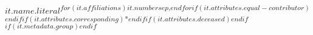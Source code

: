 $it.name.literal$\textsuperscript{$for(it.affiliations)$$it.number$$sep$,$endfor$$if(it.attributes.equal-contributor)$\Yinyang$endif$$if(it.attributes.corresponding)$*$endif$$if(it.attributes.deceased)$\dag$endif$$if(it.metadata.group)$\textpilcrow$endif$}
